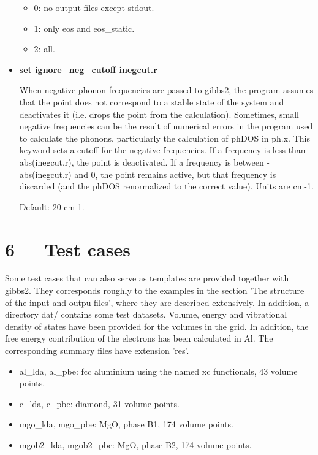 \documentclass[a4paper]{article}
\begin{document}
\begin{itemize}
\begin{itemize}
\item 0: no output files except stdout.

\item 1: only eos and eos\_static.

\item 2: all.

\end{itemize}

\item \textbf{set ignore\_neg\_cutoff inegcut.r}

When negative phonon frequencies are passed to gibbs2, the program
assumes that the point does not correspond to a stable state of
the system and deactivates it (i.e. drops the point from the
calculation). Sometimes, small negative frequencies can be the
result of numerical errors in the program used to calculate the
phonons, particularly the calculation of phDOS in ph.x. This keyword
sets a cutoff for the negative frequencies. If a frequency is
less than -abs(inegcut.r), the point is deactivated. If a frequency
is between -abs(inegcut.r) and 0, the point remains active, but
that frequency is discarded (and the phDOS renormalized to the
correct value). Units are cm-1.

Default: 20 cm-1.

\end{itemize}


\section{6~~~Test cases%
  \label{test-cases}%
}

Some test cases that can also serve as templates are provided together
with gibbs2. They corresponds roughly to the examples in the section
'The structure of the input and outpu files', where they are described
extensively. In addition, a directory dat/ contains some test
datasets. Volume, energy and vibrational density of states have been
provided for the volumes in the grid. In addition, the free energy
contribution of the electrons has been calculated in Al. The
corresponding summary files have extension 'res'.
%
\begin{itemize}

\item al\_lda, al\_pbe: fcc aluminium using the named xc functionals, 43
volume points.

\item c\_lda, c\_pbe: diamond, 31 volume points.

\item mgo\_lda, mgo\_pbe: MgO, phase B1, 174 volume points.

\item mgob2\_lda, mgob2\_pbe: MgO, phase B2, 174 volume points.

\end{itemize}
\end{document}
